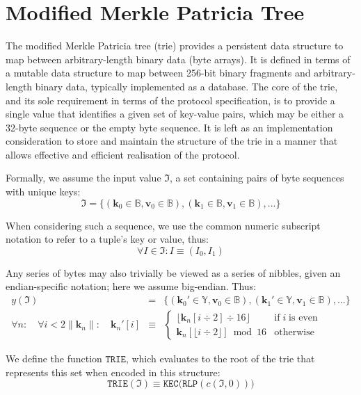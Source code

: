 \documentclass[9pt,oneside]{amsart}
\begin{document}
\section{Modified Merkle Patricia Tree}\label{app:trie}\hypertarget{trie}{}
The modified Merkle Patricia tree (trie) provides a persistent data structure to map between arbitrary-length binary data (byte arrays). It is defined in terms of a mutable data structure to map between 256-bit binary fragments and arbitrary-length binary data, typically implemented as a database. The core of the trie, and its sole requirement in terms of the protocol specification, is to provide a single value that identifies a given set of key-value pairs, which may be either a 32-byte sequence or the empty byte sequence. It is left as an implementation consideration to store and maintain the structure of the trie in a manner that allows effective and efficient realisation of the protocol.

Formally, we assume the input value $\mathfrak{I}$, a set containing pairs of byte sequences with unique keys:
\begin{equation}
\mathfrak{I} = \{ (\mathbf{k}_0 \in \mathbb{B}, \mathbf{v}_0 \in \mathbb{B}), (\mathbf{k}_1 \in \mathbb{B}, \mathbf{v}_1 \in \mathbb{B}), ... \}
\end{equation}

When considering such a sequence, we use the common numeric subscript notation to refer to a tuple's key or value, thus:
\begin{equation}
\forall I \in \mathfrak{I}: I \equiv (I_0, I_1)
\end{equation}

Any series of bytes may also trivially be viewed as a series of nibbles, given an endian-specific notation; here we assume big-endian. Thus:
\begin{eqnarray}
y(\mathfrak{I}) & = & \{ (\mathbf{k}_0' \in \mathbb{Y}, \mathbf{v}_0 \in \mathbb{B}), (\mathbf{k}_1' \in \mathbb{Y}, \mathbf{v}_1 \in \mathbb{B}), ... \} \\
\forall n: \quad \forall i < 2\lVert\mathbf{k}_{n}\rVert: \quad \mathbf{k}_{n}'[i] & \equiv &
\begin{cases}
\lfloor \mathbf{k}_{n}[i \div 2] \div 16 \rfloor & \text{if} \; i \; \text{is even} \\
\mathbf{k}_{n}[\lfloor i \div 2 \rfloor] \bmod 16 & \text{otherwise}
\end{cases}
\end{eqnarray}

We define the function $\texttt{TRIE}$, which evaluates to the root of the trie that represents this set when encoded in this structure:
\begin{equation}
\texttt{TRIE}(\mathfrak{I}) \equiv \texttt{KEC}\big(\texttt{RLP} (c(\mathfrak{I}, 0))\big)
\end{equation}
\end{document}
